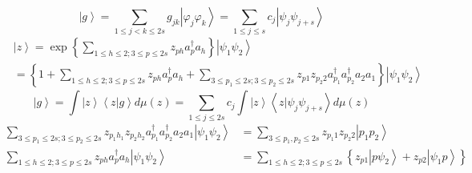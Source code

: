 \documentclass[aps,preprint]{revtex4}%
\begin{document}
\begin{equation}
\left\vert g\right\rangle =%
{\displaystyle\sum\limits_{1\leq j<k\leq2s}}
g_{jk}\left\vert \varphi_{j}\varphi_{k}\right\rangle =%
{\displaystyle\sum\limits_{1\leq j\leq s}}
c_{j}\left\vert \psi_{j}\psi_{j+s}\right\rangle
\end{equation}%
\begin{align}
&  \left\vert z\right\rangle =\exp\left\{
{\displaystyle\sum\limits_{1\leq h\leq2;3\leq p\leq2s}}
z_{ph}a_{p}^{\dagger}a_{h}\right\}  \left\vert \psi_{1}\psi_{2}\right\rangle
\\
&  =\left\{  1+%
{\displaystyle\sum\limits_{1\leq h\leq2;3\leq p\leq2s}}
z_{ph}a_{p}^{\dagger}a_{h}+%
{\displaystyle\sum\limits_{3\leq p_{1}\leq2s;3\leq p_{2}\leq2s}}
z_{p1}z_{p_{2}2}a_{p_{1}}^{\dagger}a_{p_{2}}^{\dagger}a_{2}a_{1}\right\}
\left\vert \psi_{1}\psi_{2}\right\rangle
\end{align}%
\begin{equation}
\left\vert g\right\rangle =%
{\displaystyle\int}
\left\vert z\right\rangle \left\langle \left.  z\right\vert g\right\rangle
d\mu\left(  z\right)  =%
{\displaystyle\sum\limits_{1\leq j\leq2s}}
c_{j}%
{\displaystyle\int}
\left\vert z\right\rangle \left\langle \left.  z\right\vert \psi_{j}\psi
_{j+s}\right\rangle d\mu\left(  z\right)
\end{equation}%
\begin{align}%
{\displaystyle\sum\limits_{3\leq p_{1}\leq2s;3\leq p_{2}\leq2s}}
z_{p_{1}h_{1}}z_{p_{2}h_{2}}a_{p_{1}}^{\dagger}a_{p_{2}}^{\dagger}a_{2}%
a_{1}\left\vert \psi_{1}\psi_{2}\right\rangle  & =%
{\displaystyle\sum\limits_{3\leq p_{1},p_{2}\leq2s}}
z_{p_{1}1}z_{p_{2}2}\left\vert p_{1}p_{2}\right\rangle \\%
{\displaystyle\sum\limits_{1\leq h\leq2;3\leq p\leq2s}}
z_{ph}a_{p}^{\dagger}a_{h}\left\vert \psi_{1}\psi_{2}\right\rangle  & =%
{\displaystyle\sum\limits_{1\leq h\leq2;3\leq p\leq2s}}
\left\{  z_{p1}\left\vert p\psi_{2}\right\rangle +z_{p2}\left\vert \psi
_{1}p\right\rangle \right\}
\end{align}%
\end{document}
